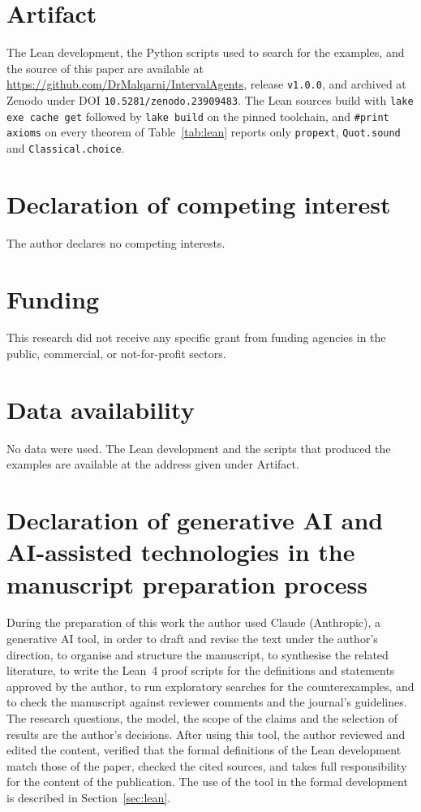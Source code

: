 \documentclass[preprint,12pt]{elsarticle}
\theoremstyle{plain}
\theoremstyle{definition}
\begin{document}
\section*{Artifact}
The Lean development, the Python scripts used to search for the examples, and the source of this paper are available at \url{https://github.com/DrMalqarni/IntervalAgents}, release \texttt{v1.0.0}, and archived at Zenodo under DOI \texttt{10.5281/zenodo.23909483}. The Lean sources build with \texttt{lake exe cache get} followed by \texttt{lake build} on the pinned toolchain, and \texttt{\#print axioms} on every theorem of Table~\ref{tab:lean} reports only \texttt{propext}, \texttt{Quot.sound} and \texttt{Classical.choice}.

\section*{Declaration of competing interest}
The author declares no competing interests.

\section*{Funding}
This research did not receive any specific grant from funding agencies in the public, commercial, or not-for-profit sectors.

\section*{Data availability}
No data were used. The Lean development and the scripts that produced the examples are available at the address given under Artifact.

\section*{Declaration of generative AI and AI-assisted technologies in the manuscript preparation process}
During the preparation of this work the author used Claude (Anthropic), a generative AI tool, in order to draft and revise the text under the author's direction, to organise and structure the manuscript, to synthesise the related literature, to write the Lean~4 proof scripts for the definitions and statements approved by the author, to run exploratory searches for the counterexamples, and to check the manuscript against reviewer comments and the journal's guidelines. The research questions, the model, the scope of the claims and the selection of results are the author's decisions. After using this tool, the author reviewed and edited the content, verified that the formal definitions of the Lean development match those of the paper, checked the cited sources, and takes full responsibility for the content of the publication. The use of the tool in the formal development is described in Section~\ref{sec:lean}.



\end{document}
